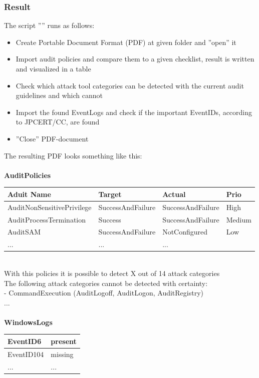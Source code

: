 \subsubsection{Result} \label{resultVisualize}
The script '''' runs as follows:
\begin{itemize}
    \item Create Portable Document Format (PDF) at given folder and ''open'' it
    \item Import audit policies and compare them to a given checklist, result is written and visualized in a table
    \item Check which attack tool categories can be detected with the current audit guidelines and which cannot
    \item Import the found EventLogs and check if the important EventIDs, according to JPCERT/CC, are found
    \item ''Close'' PDF-document
\end{itemize}
The resulting PDF looks something like this: \ \\
\ \\
\textbf{AuditPolicies}
\begin{table}[H]
    \centering
    \begin{tabular}{| p{4.5cm} |  p{4cm} | p{4cm} | p{2.5cm}|} \hline
        Aduit Name & Target & Actual & Prio\\ \hline
        AuditNonSensitivePrivilege & SuccessAndFailure &\cellcolor{green} SuccessAndFailure & High\\ \hline
        AuditProcessTermination & Success &\cellcolor{darkgreen} SuccessAndFailure & Medium \\ \hline
        AuditSAM & SuccessAndFailure &\cellcolor{red} NotConfigured & Low\\ \hline
        ... & ... & ... &\\ \hline
    \end{tabular}
\end{table}\ \\
With this policies it is possible to detect X out of 14 attack categories \ \\
The following attack categories cannot be detected with certainty: \\
- CommandExecution (AuditLogoff, AuditLogon, AuditRegistry) \\
... \ \\
\ \\
\textbf{WindowsLogs}
\begin{table}[H]
    \centering
    \begin{tabular}{| p{8cm} |  p{8cm} |} \hline
        EventID6 & present \\ \hline
        EventID104 & missing \\ \hline
        ... & ... \\ \hline
    \end{tabular}
\end{table}
